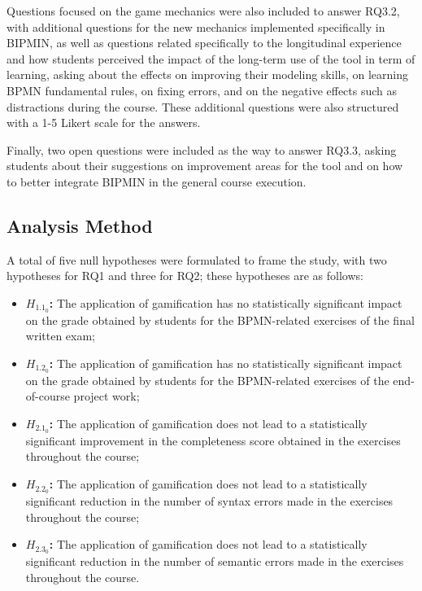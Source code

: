 Questions focused on the game mechanics were also included to answer RQ3.2, with additional questions for the new mechanics implemented specifically in BIPMIN, as well as questions related specifically to the longitudinal experience and how students perceived the impact of the long-term use of the tool in term of learning, asking about the effects on improving their modeling skills, on learning BPMN fundamental rules, on fixing errors, and on the negative effects such as distractions during the course. These additional questions were also structured with a 1-5 Likert scale for the answers.

Finally, two open questions were included as the way to answer RQ3.3, asking students about their suggestions on improvement areas for the tool and on how to better integrate BIPMIN in the general course execution.

\subsection{Analysis Method}

A total of five null hypotheses were formulated to frame the study, with two hypotheses for RQ1 and three for RQ2; these hypotheses are as follows:


\begin{itemize}
    \item \textbf{${H_{1.1_{0}}}$:} The application of gamification has no statistically significant impact on the grade obtained by students for the BPMN-related exercises of the final written exam;
    \item \textbf{${H_{1.2_{0}}}$:} The application of gamification has no statistically significant impact on the grade obtained by students for the BPMN-related exercises of the end-of-course project work;
    \item \textbf{${H_{2.1_{0}}}$:} The application of gamification does not lead to a statistically significant improvement in the completeness score obtained in the exercises throughout the course;
    \item \textbf{${H_{2.2_{0}}}$:} The application of gamification does not lead to a statistically significant reduction in the number of syntax errors made in the exercises throughout the course;
    \item \textbf{${H_{2.3_{0}}}$:} The application of gamification does not lead to a statistically significant reduction in the number of semantic errors made in the exercises throughout the course.
\end{itemize}

